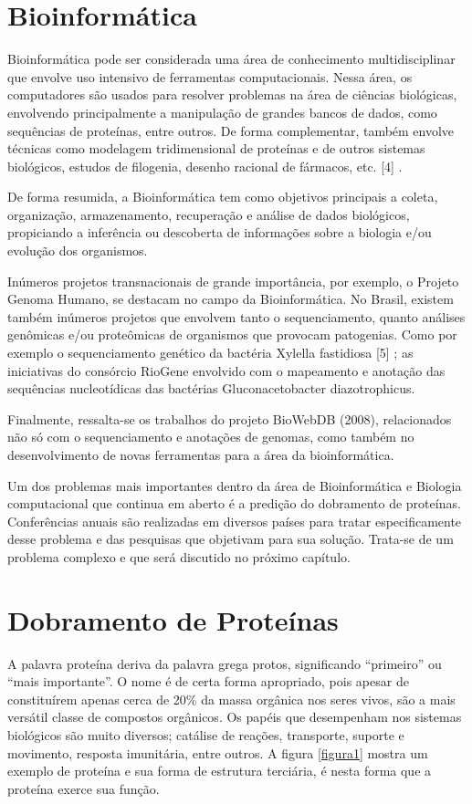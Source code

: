 \documentclass[dm,ppgcomp]{texfurg}
\begin{document}
\chapter{Bioinformática}

Bioinformática pode ser considerada uma área de conhecimento multidisciplinar que envolve uso intensivo de ferramentas computacionais. Nessa área, os computadores são usados para resolver problemas na área de ciências biológicas, envolvendo principalmente a manipulação de grandes bancos de dados, como sequências de proteínas, entre outros. De forma complementar, também envolve técnicas como modelagem tridimensional de proteínas e de outros sistemas biológicos, estudos de filogenia, desenho racional de fármacos, etc. [4] .

De forma resumida, a Bioinformática tem como objetivos principais a coleta, organização, armazenamento, recuperação e análise de dados biológicos, propiciando a inferência ou descoberta de informações sobre a biologia e/ou evolução dos organismos.

Inúmeros projetos transnacionais de grande importância, por exemplo, o Projeto Genoma Humano, se destacam no campo da Bioinformática. No Brasil, existem também  inúmeros projetos que envolvem tanto o sequenciamento, quanto análises genômicas e/ou proteômicas de organismos que provocam patogenias. Como por exemplo o sequenciamento genético da bactéria Xylella fastidiosa [5] ; as iniciativas do consórcio RioGene envolvido com o mapeamento e anotação das sequências nucleotídicas das bactérias Gluconacetobacter diazotrophicus.

Finalmente, ressalta-se os trabalhos do projeto BioWebDB (2008), relacionados não só com o sequenciamento e anotações de genomas, como também no desenvolvimento de novas ferramentas para a área da bioinformática. 

Um dos problemas mais importantes dentro da área de Bioinformática e Biologia computacional que continua em aberto é a predição do dobramento de proteínas. Conferências anuais são realizadas em diversos países para tratar especificamente desse problema e das pesquisas que objetivam para sua solução. Trata-se de um problema complexo e que será discutido no próximo capítulo.

\chapter{Dobramento de Proteínas}

A palavra proteína deriva da palavra grega protos, significando “primeiro” ou “mais importante”. O nome é de certa forma apropriado, pois apesar de constituírem apenas cerca de 20\% da massa orgânica nos seres vivos, são a mais versátil classe de compostos orgânicos. Os papéis que desempenham nos sistemas biológicos são muito diversos; catálise de reações, transporte, suporte e movimento, resposta imunitária, entre outros. A figura \ref{figura1} mostra um exemplo de proteína e sua forma de estrutura terciária, é nesta forma que a proteína exerce sua função.
\end{document}
